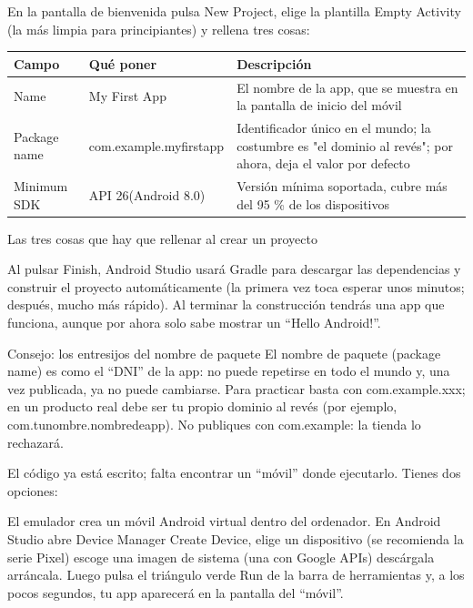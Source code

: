 En la pantalla de bienvenida pulsa New Project, elige la plantilla Empty Activity (la más limpia para principiantes) y rellena tres cosas:

\begin{center}
\begin{tabularx}{\linewidth}{|X|X|X|}
\hline
\textbf{Campo} & \textbf{Qué poner} & \textbf{Descripción} \tabularnewline
\hline
Name & My First App & El nombre de la app, que se muestra en la pantalla de inicio del móvil \tabularnewline
Package name & com.example.myfirstapp & Identificador único en el mundo; la costumbre es "el dominio al revés"; por ahora, deja el valor por defecto \tabularnewline
Minimum SDK & API 26(Android 8.0) & Versión mínima soportada, cubre más del 95 \% de los dispositivos \tabularnewline
\hline
\end{tabularx}
\end{center}

\begin{center}\small\color{gray}Las tres cosas que hay que rellenar al crear un proyecto\end{center}

Al pulsar Finish, Android Studio usará Gradle para descargar las dependencias y construir el proyecto automáticamente (la primera vez toca esperar unos minutos; después, mucho más rápido). Al terminar la construcción tendrás una app que funciona, aunque por ahora solo sabe mostrar un “Hello Android!”.

\begin{tcbinfo}{Consejo: los entresijos del nombre de paquete}
El nombre de paquete (package name) es como el “DNI” de la app: no puede repetirse en todo el mundo y, una vez publicada, ya no puede cambiarse. Para practicar basta con com.example.xxx; en un producto real debe ser tu propio dominio al revés (por ejemplo, com.tunombre.nombredeapp). No publiques con com.example: la tienda lo rechazará.

\end{tcbinfo}


El código ya está escrito; falta encontrar un “móvil” donde ejecutarlo. Tienes dos opciones:


El emulador crea un móvil Android virtual dentro del ordenador. En Android Studio abre Device Manager Create Device, elige un dispositivo (se recomienda la serie Pixel) escoge una imagen de sistema (una con Google APIs) descárgala arráncala. Luego pulsa el triángulo verde Run de la barra de herramientas y, a los pocos segundos, tu app aparecerá en la pantalla del “móvil”.

